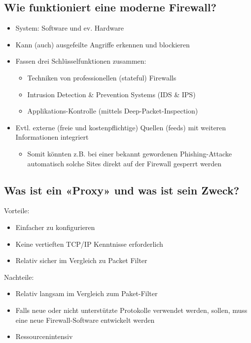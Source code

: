 \pagebreak
\subsection*{Wie funktioniert eine moderne Firewall?}
\begin{itemize}
    \item System: Software und ev. Hardware
    \item Kann (auch) ausgefeilte Angriffe erkennen und blockieren
    \item Fassen drei Schlüsselfunktionen zusammen:
    \begin{itemize}
        \item Techniken von professionellen (stateful) Firewalls
        \item Intrusion Detection \& Prevention Systems (IDS \& IPS)
        \item Applikations-Kontrolle (mittels Deep-Packet-Inspection)
    \end{itemize}
    \item Evtl. externe (freie und kostenpflichtige) Quellen (feeds) mit weiteren Informationen integriert
    \begin{itemize}
        \item Somit könnten z.B. bei einer bekannt gewordenen Phishing-Attacke automatisch solche Sites direkt auf der Firewall gesperrt werden
    \end{itemize}
\end{itemize}

\subsection*{Was ist ein «Proxy» und was ist sein Zweck?}
Vorteile:
\begin{itemize}
    \item Einfacher zu konfigurieren
    \item Keine vertieften TCP/IP Kenntnisse erforderlich
    \item Relativ sicher im Vergleich zu Packet Filter
\end{itemize}
Nachteile:
\begin{itemize}
    \item Relativ langsam im Vergleich zum Paket-Filter
    \item Falls neue oder nicht unterstützte Protokolle verwendet werden, sollen, muss eine neue Firewall-Software entwickelt werden
    \item Ressourcenintensiv
\end{itemize}

